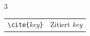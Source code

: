 \documentclass[10pt,landscape]{article}
\makeatletter
\renewcommand{\subsection}{\@startsection{subsection}{2}{0mm}%
                                {-1explus -.5ex minus -.2ex}%
                                {0.5ex plus .2ex}%
                                {\normalfont\normalsize\bfseries}}
\makeatother
\begin{document}
\begin{multicols}{3}
\begin{tabular}{@{}p{\the\MyLen}@{}p{\linewidth-\the\MyLen}@{}}
\verb!\cite{!\textit{key}\verb!}!       &
        Zitiert \textit{key} \\
\end{tabular}

% 
% 



\end{multicols}
\end{document}
